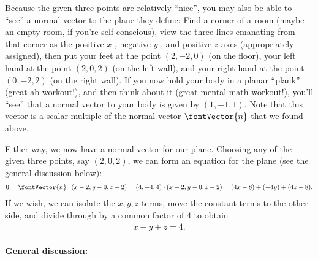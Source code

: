 {Because the given three points are relatively ``nice'', you may also be able to ``see'' a normal vector to the plane they define: Find a corner of a room (maybe an empty room, if you're self-conscious), view the three lines emanating from that corner as the positive $x$-, negative $y$-, and positive $z$-axes (appropriately assigned), then put your feet at the point $(2,-2,0)$ (on the floor), your left hand at the point $(2,0,2)$ (on the left wall), and your right hand at the point $(0,-2,2)$ (on the right wall). If you now hold your body in a planar ``plank'' (great ab workout!), and then think about it (great mental-math workout!), you'll ``see'' that a normal vector to your body is given by $(1,-1,1)$. Note that this vector is a scalar multiple of the normal vector $\fontVector{n}$ that we found above.

Either way, we now have a normal vector for our plane. Choosing any of the given three points, say $(2,0,2)$, we can form an equation for the plane (see the general discussion below):
\begin{align*}
0
=
\fontVector{n} \cdot (x - 2,y - 0,z - 2)
=
(4,-4,4) \cdot (x - 2,y - 0,z - 2)
=
(4 x - 8) + (-4 y) + (4 z - 8).
\end{align*}
If we wish, we can isolate the $x,y,z$ terms, move the constant terms to the other side, and divide through by a common factor of $4$ to obtain
\begin{align*}
x - y + z
=
4.
\end{align*}



\paragraph{General discussion:}

}

